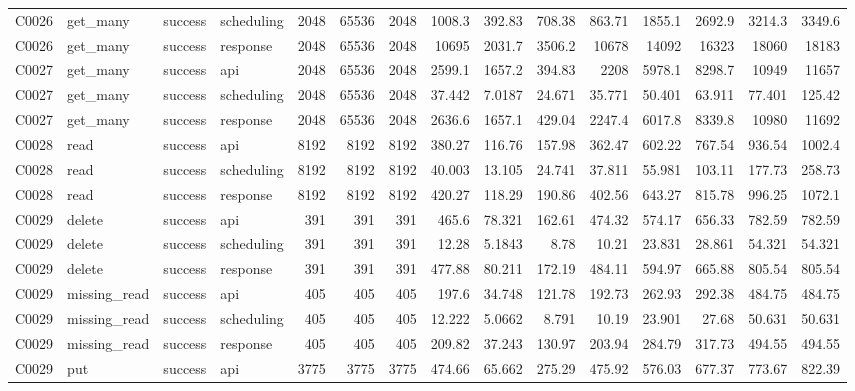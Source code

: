 \begin{landscape}
\begin{longtable}{llllrrrrrrrrrrr}
C0026 & get\_\allowbreak{}many & success & scheduling & 2048 & 65536 & 2048 & 1008.3 & 392.83 & 708.38 & 863.71 & 1855.1 & 2692.9 & 3214.3 & 3349.6\\
C0026 & get\_\allowbreak{}many & success & response & 2048 & 65536 & 2048 & 10695 & 2031.7 & 3506.2 & 10678 & 14092 & 16323 & 18060 & 18183\\
C0027 & get\_\allowbreak{}many & success & api & 2048 & 65536 & 2048 & 2599.1 & 1657.2 & 394.83 & 2208 & 5978.1 & 8298.7 & 10949 & 11657\\
C0027 & get\_\allowbreak{}many & success & scheduling & 2048 & 65536 & 2048 & 37.442 & 7.0187 & 24.671 & 35.771 & 50.401 & 63.911 & 77.401 & 125.42\\
C0027 & get\_\allowbreak{}many & success & response & 2048 & 65536 & 2048 & 2636.6 & 1657.1 & 429.04 & 2247.4 & 6017.8 & 8339.8 & 10980 & 11692\\
C0028 & read & success & api & 8192 & 8192 & 8192 & 380.27 & 116.76 & 157.98 & 362.47 & 602.22 & 767.54 & 936.54 & 1002.4\\
C0028 & read & success & scheduling & 8192 & 8192 & 8192 & 40.003 & 13.105 & 24.741 & 37.811 & 55.981 & 103.11 & 177.73 & 258.73\\
C0028 & read & success & response & 8192 & 8192 & 8192 & 420.27 & 118.29 & 190.86 & 402.56 & 643.27 & 815.78 & 996.25 & 1072.1\\
C0029 & delete & success & api & 391 & 391 & 391 & 465.6 & 78.321 & 162.61 & 474.32 & 574.17 & 656.33 & 782.59 & 782.59\\
C0029 & delete & success & scheduling & 391 & 391 & 391 & 12.28 & 5.1843 & 8.78 & 10.21 & 23.831 & 28.861 & 54.321 & 54.321\\
C0029 & delete & success & response & 391 & 391 & 391 & 477.88 & 80.211 & 172.19 & 484.11 & 594.97 & 665.88 & 805.54 & 805.54\\
C0029 & missing\_\allowbreak{}read & success & api & 405 & 405 & 405 & 197.6 & 34.748 & 121.78 & 192.73 & 262.93 & 292.38 & 484.75 & 484.75\\
C0029 & missing\_\allowbreak{}read & success & scheduling & 405 & 405 & 405 & 12.222 & 5.0662 & 8.791 & 10.19 & 23.901 & 27.68 & 50.631 & 50.631\\
C0029 & missing\_\allowbreak{}read & success & response & 405 & 405 & 405 & 209.82 & 37.243 & 130.97 & 203.94 & 284.79 & 317.73 & 494.55 & 494.55\\
C0029 & put & success & api & 3775 & 3775 & 3775 & 474.66 & 65.662 & 275.29 & 475.92 & 576.03 & 677.37 & 773.67 & 822.39\\

\end{longtable}
\end{landscape}
